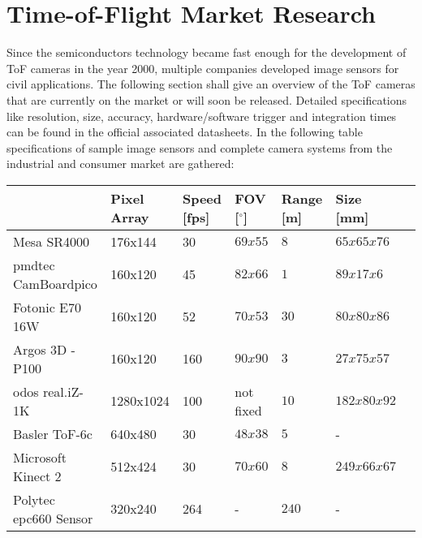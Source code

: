 \section{Time-of-Flight Market Research}

Since the semiconductors technology became fast enough for the development of ToF cameras in the year 2000, multiple companies developed image sensors for civil applications. The following section shall give an overview of the ToF cameras that are currently on the market or will soon be released. Detailed specifications like resolution, size, accuracy, hardware/software trigger and integration times can be found in the official associated datasheets. In the following table specifications of sample image sensors and complete camera systems from the industrial and consumer market are gathered:
\begin{center} 
	\begin{tabular}{| l | l | l | l | l | l | l |}
		\hline
		 & Pixel Array & Speed [fps] & FOV [$^\circ$] & Range [m] & Size [mm]  \\ \hline
		 Mesa SR4000 & 176x144 & 30 & $69x55$ & $8$ & $65x65x76$  \\ \hline
		 pmdtec CamBoardpico & 160x120 & 45 & $82x66$ & $1$ & $89x17x6$ \\ \hline		 
		 Fotonic E70 16W & 160x120 & 52 & $70x53$ & $30$ & $80x80x86$  \\ \hline
		 Argos 3D - P100 & 160x120 & 160 & $90x90$ & $3$ & $27x75x57$  \\ \hline
		 odos real.iZ-1K & 1280x1024 & 100  & not fixed & $10$ & $182x80x92$ \\ \hline
		 Basler ToF-6c & 640x480 & 30 & $48x38$ & $5$ & - \\ \hline
		 Microsoft Kinect 2 & 512x424 & 30 & $70x60$ & $8$ & $249x66x67$ \\ \hline
		 Polytec epc660 Sensor & 320x240  & 264 & - & $240$ & - \\
		 \hline	
	\end{tabular} 	
\end{center}
